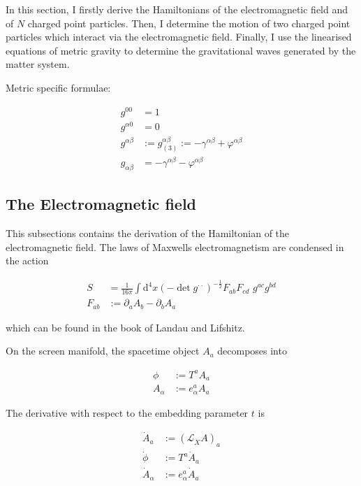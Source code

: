 \documentclass[11pt]{article}
\begin{document}
In this section, I firstly derive the Hamiltonians of the electromagnetic field and of $N$ charged point particles. Then, I determine the motion of two charged point particles which interact via the electromagnetic field. Finally, I use the linearised equations of metric gravity to determine the gravitational waves generated by the matter system. 

Metric specific formulae:

\begin{align}
	g^{00} &= 1 \\
	g^{\alpha 0} &= 0 \\
	g^{\alpha \beta} &:= g_{(3)}^{\alpha \beta}  := - \gamma^{\alpha \beta} + \varphi^{\alpha \beta}\\
	g_{\alpha \beta} &= - \gamma^{\alpha \beta} - \varphi^{\alpha \beta}
\end{align}

\subsection{The Electromagnetic field} \label{metric_em}

This subsections contains the derivation of the Hamiltonian of the electromagnetic field. The laws of Maxwells electromagnetism are condensed in the action

\begin{align}
	S &= \frac{1}{16 \pi} \int \mathrm{d}^4 x \left( - \det{g^{\cdot \cdot}} \right)^{-\frac{1}{2}} F_{ab} F_{cd} \, \, g^{ac} g^{bd}\\
	F_{ab} &:= \partial_a A_b - \partial_b A_a 
\end{align}

which can be found in the book of Landau and Lifshitz.

On the screen manifold, the spacetime object $A_a$ decomposes into

\begin{align}
	\phi &:= T^a A_a\\
	A_{\alpha} &:= e^a_{\alpha} A_a
\end{align}

The derivative with respect to the embedding parameter $t$ is 

\begin{align}
	\dot{A}_{a} &:= \left( \mathcal{L}_{\dot{X}} A \right)_a\\
	\dot{\phi} &:= T^a \dot{A}_{a}\\
	\dot{A}_{\alpha} &:= e^a_{\alpha} \dot{A}_{a}
\end{align}
\end{document}
